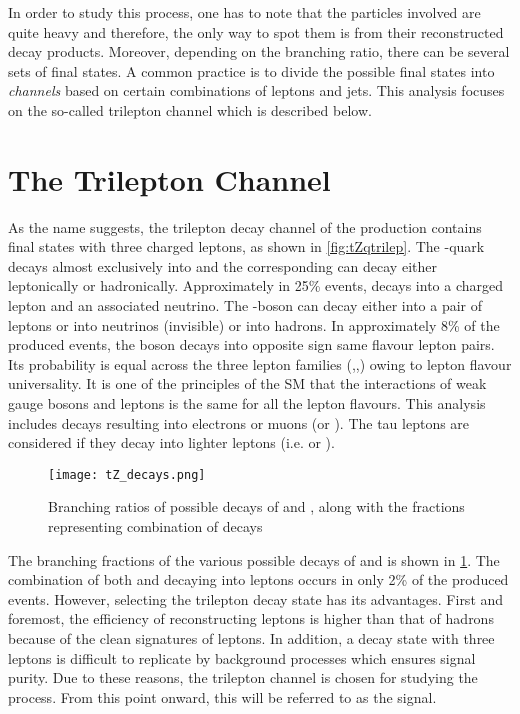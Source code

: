 In order to study this process, one has to note 
that the particles involved are quite heavy and therefore,
the only way to spot them is from their reconstructed decay products. Moreover, depending on the 
branching ratio, there can be several sets of final states.
A common practice is to divide the possible final states into \textit{channels}
based on certain combinations of leptons and jets. This analysis focuses on
the so-called trilepton channel which is described below.

\section{The \tZqsec Trilepton Channel}
As the name suggests, the trilepton decay channel of the \tZq production 
contains final states with three charged leptons, as shown in \cref{fig:tZqtrilep}. The
\Ptop-quark decays almost exclusively into \Pbottom\PW and the corresponding \PW can decay either
leptonically or hadronically. Approximately in 25\% events, \PW decays into a charged lepton and
an associated neutrino. The \PZ-boson can decay either into a pair of leptons or into neutrinos (invisible)
or into hadrons. In approximately 8\% of the produced events, the \PZ boson decays 
into opposite sign same flavour lepton pairs. Its probability 
is equal across the three lepton families (\Pelectron,\Pmuon,\Ptauon) owing to 
lepton flavour universality. It is one of the principles of the SM that the interactions of weak gauge 
bosons and leptons is the same for all the lepton flavours. This analysis includes \PZ decays resulting into electrons or muons 
(\Pelectron\APelectron or \Pmuon\APmuon). The tau leptons are considered if they decay into lighter
leptons (i.e. \Pelectron or \Pmuon). 

\begin{figure}
  \centering
      \texttt{[image: tZ\_decays.png]}
      \caption{Branching ratios of possible decays of \Ptop and \PZ, along with the fractions representing
      combination of decays~\cite{irina:2018}}
         \label{fig:tZqdecays}
\end{figure}

The branching fractions of the various possible decays of \Ptop and \PZ is shown in \cref{fig:tZqdecays}.
The combination of both \Ptop and \PZ decaying into leptons occurs in only 2\% of the produced \tZq events.
However, selecting the trilepton decay state has its advantages. First and foremost, the efficiency of 
reconstructing leptons is higher than that of hadrons because of the clean signatures of leptons. 
In addition, a decay state with three leptons is difficult to replicate by 
background processes which ensures signal purity. 
Due to these reasons, the trilepton channel is chosen for studying the 
\tZq process. From this point onward, this will be referred to as the signal.

